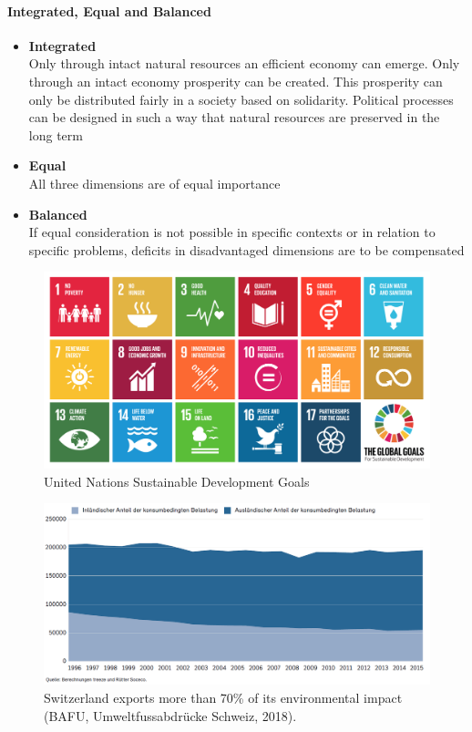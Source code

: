 \documentclass[11pt]{article}
\theoremstyle{definition}
\begin{document}
\paragraph{Integrated, Equal and Balanced}
\begin{itemize}
	\item \textbf{Integrated}\\
	Only through intact natural resources an efficient economy can emerge. Only through an intact economy prosperity can be created. This prosperity can only be distributed fairly in a society based on solidarity. Political processes can be designed in such a way that natural resources are preserved in the long term
	\item \textbf{Equal}\\
	All three dimensions are of equal importance
	\item \textbf{Balanced}\\
	If equal consideration is not possible in specific contexts or in relation to specific problems, deficits in disadvantaged dimensions are to be compensated
\end{itemize}

\begin{figure}[H]
	\centering
	\includegraphics[width=0.9\linewidth]{img/sustainable_development_goals}
	\caption{United Nations Sustainable Development Goals}
	\label{fig:sustainabledevelopmentgoals}
\end{figure}

\begin{figure}[H]
	\centering
	\includegraphics[width=0.8\linewidth]{img/environmental_impact_switzerland}
	\caption{Switzerland exports more than 70\% of its environmental impact (BAFU, Umweltfussabdrücke Schweiz, 2018).}
	\label{fig:environmentalimpactswitzerland}
\end{figure}
\end{document}
